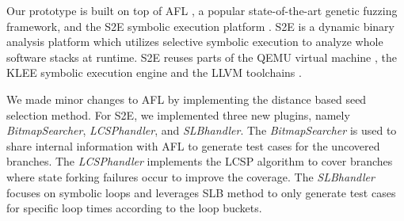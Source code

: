 Our prototype is built on top of AFL \cite{online:afl}, a popular state-of-the-art genetic fuzzing framework, and the S2E symbolic execution platform \cite{chipounov2011s2e}. S2E is a dynamic binary analysis platform which utilizes selective symbolic execution to analyze whole software stacks at runtime. S2E reuses parts of the QEMU virtual machine \cite{bellard2005qemu}, the KLEE symbolic execution engine \cite{cadar2008klee} and the LLVM toolchains \cite{lattner2004llvm}.

We made minor changes to AFL by implementing the distance based seed selection method. For S2E, we implemented three new plugins, namely \textit{BitmapSearcher}, \textit{LCSPhandler}, and \textit{SLBhandler}. The \textit{BitmapSearcher} is used to share internal information with AFL to generate test cases for the uncovered branches. The \textit{LCSPhandler} implements the LCSP algorithm to cover branches where state forking failures occur to improve the coverage. The \textit{SLBhandler} focuses on symbolic loops and leverages SLB method to only generate test cases for specific loop times according to the loop buckets. 
